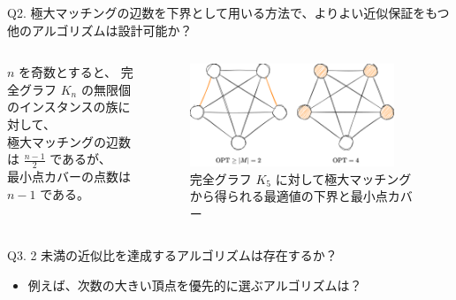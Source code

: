 \documentclass[aspectratio=169]{beamer}
\begin{document}
\begin{frame}{Q2. 極大マッチングの辺数を下界として用いる方法で、よりよい近似保証をもつ\\他のアルゴリズムは設計可能か？}
	\begin{example}
		\begin{columns}
			\begin{column}{0.5\textwidth}
				\(n\) を奇数とすると、
				完全グラフ \(K_n\) の無限個のインスタンスの族に対して、\\
				極大マッチングの辺数は \(\frac{n-1}{2}\) であるが、\\
				最小点カバーの点数は \(n-1\) である。
			\end{column}
			\begin{column}{0.5\textwidth}
				\begin{figure}
					\centering
					\includegraphics[width=0.9\textwidth]{figures/complete.png}
					\caption{完全グラフ \(K_5\) に対して極大マッチングから得られる最適値の下界と最小点カバー}
				\end{figure}
			\end{column}
		\end{columns}
	\end{example}

\end{frame}

\begin{frame}{Q3. 2 未満の近似比を達成するアルゴリズムは存在するか？}
	\begin{itemize}
		\item 例えば、次数の大きい頂点を優先的に選ぶアルゴリズムは？
	\end{itemize}
\end{frame}

\appendix
\end{document}
